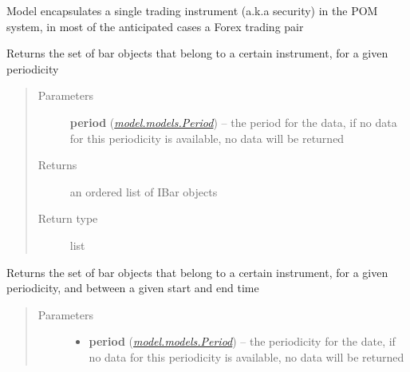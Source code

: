 \documentclass[letterpaper,10pt,english]{sphinxmanual}
\begin{document}
\begin{fulllineitems}
\label{index:model.models.Instrument}
Model encapsulates a single trading instrument (a.k.a security) in the POM system,
in most of the anticipated cases a Forex trading pair

\begin{fulllineitems}
\label{index:model.models.Instrument.get_bar_collection}
Returns the set of bar objects that belong to a certain instrument, for a given periodicity
\begin{quote}\begin{description}
\item[{Parameters}] \leavevmode
\textbf{period} ({\hyperref[index:model.models.Period]{\emph{model.models.Period}}}) -- the period for the data, if no data for this periodicity is available, no data will be returned

\item[{Returns}] \leavevmode
an ordered list of IBar objects

\item[{Return type}] \leavevmode
list

\end{description}\end{quote}

\end{fulllineitems}


\begin{fulllineitems}
\label{index:model.models.Instrument.get_bar_collection_timeframe}
Returns the set of bar objects that belong to a certain instrument, for a given periodicity, and between
a given start and end time
\begin{quote}\begin{description}
\item[{Parameters}] \leavevmode\begin{itemize}
\item {} 
\textbf{period} ({\hyperref[index:model.models.Period]{\emph{model.models.Period}}}) -- the periodicity for the date, if no data for this periodicity is available, no data will be returned


\end{itemize}
\end{description}
\end{quote}
\end{fulllineitems}
\end{fulllineitems}
\end{document}
